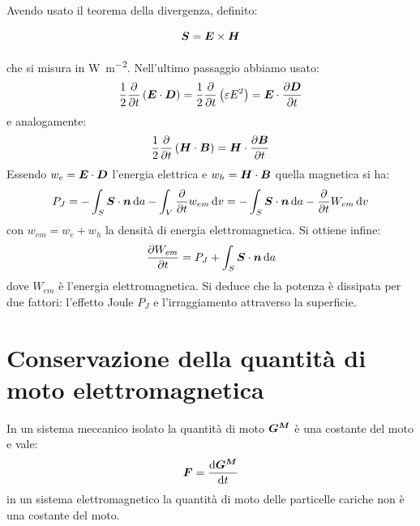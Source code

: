 Avendo usato il teorema della divergenza, definito:
\begin{Def}
  \begin{equation}
    \boldsymbol{S}=\boldsymbol{E}\times\boldsymbol{H}
  \end{equation}
\end{Def}
che si misura in \si{\watt\per\meter\squared}. Nell'ultimo passaggio abbiamo usato:
\begin{equation}
  \frac{1}{2}\frac{\partial}{\partial t}\left(\boldsymbol{E}\cdot\boldsymbol{D}\right)=\frac{1}{2}\frac{\partial}{\partial t}\left(\varepsilon E^2\right)=\boldsymbol{E}\cdot\frac{\partial\boldsymbol{D}}{\partial t}
\end{equation}
e analogamente:
\begin{equation}
  \frac{1}{2}\frac{\partial}{\partial t}\left(\boldsymbol{H}\cdot\boldsymbol{B}\right)=\boldsymbol{H}\cdot\frac{\partial\boldsymbol{B}}{\partial t}
\end{equation}
Essendo $w_e=\boldsymbol{E}\cdot\boldsymbol{D}$ l'energia elettrica e $w_h=\boldsymbol{H}\cdot\boldsymbol{B}$ quella magnetica si ha:
\begin{equation}
  P_J=-\int_S\boldsymbol{S}\cdot\boldsymbol{n}\,\mathrm{d} a-\int_V\frac{\partial}{\partial t}{w_{em}}\,\mathrm{d} v=-\int_S\boldsymbol{S}\cdot\boldsymbol{n}\,\mathrm{d} a-\frac{\partial}{\partial t}{W_{em}}\,\mathrm{d} v
\end{equation}
con $w_{em}=w_e+w_h$ la densità di energia elettromagnetica. Si ottiene infine:
\begin{equation}
  \frac{\partial W_{em}}{\partial t}=P_J+\int_S\boldsymbol{S}\cdot\boldsymbol{n}\,\mathrm{d} a
\end{equation}
dove $W_{em}$ è l'energia elettromagnetica. Si deduce che la potenza è dissipata per due fattori: l'effetto Joule $P_J$ e l'irraggiamento attraverso la superficie.
\section{Conservazione della quantità di moto elettromagnetica}
In un sistema meccanico isolato la quantità di moto $\boldsymbol{G^M}$ è una costante del moto e vale:
\begin{equation}
  \boldsymbol{F}=\frac{\mathrm{d} \boldsymbol{G^M}}{\mathrm{d} t}
\end{equation}
in un sistema elettromagnetico la quantità di moto delle particelle cariche non è una costante del moto.

